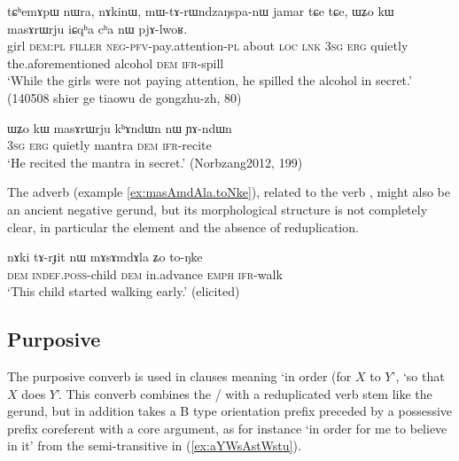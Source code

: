\begin{exe}
\ex \label{ex:masArWrju.pjAlwoR}
\gll  tɕʰemɤpɯ nɯra, nɤkinɯ, mɯ-tɤ-rɯndzaŋspa-nɯ jamar tɕe tɕe,
ɯʑo kɯ masɤrɯrju iɕqʰa cʰa nɯ pjɤ-lwoʁ. \\
girl \textsc{dem}:\textsc{pl} \textsc{filler} \textsc{neg}-\textsc{pfv}-pay.attention-\textsc{pl} about \textsc{loc} \textsc{lnk} \textsc{3sg} \textsc{erg} quietly the.aforementioned alcohol \textsc{dem} \textsc{ifr}-spill \\
\glt `While the girls were not paying attention, he spilled the alcohol in secret.' (140508 shier ge tiaowu de gongzhu-zh, 80)
\end{exe}

\begin{exe}
\ex \label{ex:masArWrju.khAndWn}
\gll ɯʑo kɯ masɤrɯrju kʰɤndɯn nɯ ɲɤ-ndɯn \\
\textsc{3sg} \textsc{erg} quietly mantra \textsc{dem} \textsc{ifr}-recite \\
\glt `He recited the mantra in secret.' (Norbzang2012, 199)
\end{exe}

The adverb  (example \ref{ex:masAmdAla.toNke}), related to the verb , might also be an ancient negative gerund, but its morphological structure is not completely clear, in particular the element  and the absence of reduplication. 

\begin{exe}
\ex \label{ex:masAmdAla.toNke}
\gll nɤki tɤ-rɟit nɯ mɤsɤmdɤla ʑo to-ŋke \\
\textsc{dem} \textsc{indef}.\textsc{poss}-child \textsc{dem} in.advance \textsc{emph} \textsc{ifr}-walk \\
\glt `This child started walking early.' (elicited)
\end{exe}



\subsection{Purposive} \label{sec:purposive.converb}
The purposive converb is used in clauses meaning `in order (for $X$ to $Y$', `so that $X$ does $Y$'. This converb combines the / with a reduplicated verb stem like the gerund, but in addition takes a B type orientation prefix preceded by a possessive prefix coreferent with a core argument, as for instance  `in order for me to believe in it' from the semi-transitive  in (\ref{ex:aYWsAstWstu}). 

